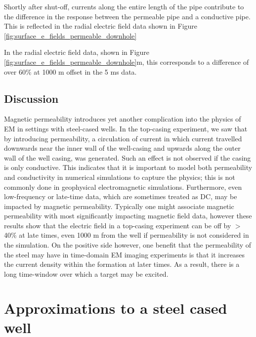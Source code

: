 




Shortly after shut-off, currents along the entire length of the pipe contribute to the difference in the response between the permeable pipe and a conductive pipe. This is reflected in the radial electric field data shown in Figure \ref{fig:surface_e_fields_permeable_downhole}

In the radial electric field data, shown in Figure \ref{fig:surface_e_fields_permeable_downhole}m, this corresponds to a difference of over 60\% at 1000 m offset in the 5 ms data.





\subsection{Discussion}
Magnetic permeability introduces yet another complication into the physics of EM in settings with steel-cased wells. In the top-casing experiment, we saw that by introducing permeability, a circulation of current in which current travelled downwards near the inner wall of the well-casing and upwards along the outer wall of the well casing, was generated. Such an effect is not observed if the casing is only conductive. This indicates that it is important to model both permeability and conductivity in numerical simulations to capture the physics; this is not commonly done in geophysical electromagnetic simulations. Furthermore, even low-frequency or late-time data, which are sometimes treated as DC, may be impacted by magnetic permeability. Typically one might associate magnetic permeability with most significantly impacting magnetic field data, however these results show that the electric field in a top-casing experiment can be off by $>$40\% at late times, even 1000 m from the well if permeability is not considered in the simulation. On the positive side however, one  benefit that the permeability of the steel may have in time-domain EM imaging experiments is that it increases the current density within the formation at later times. As a result, there is a long time-window over which a target may be excited.
\section{Approximations to a steel cased well}
\label{sec:approximating-em}

